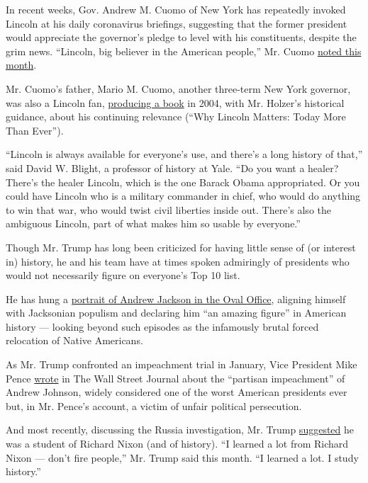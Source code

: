 In recent weeks, Gov. Andrew M. Cuomo of New York has repeatedly invoked
Lincoln at his daily coronavirus briefings, suggesting that the former
president would appreciate the governor's pledge to level with his
constituents, despite the grim news. ``Lincoln, big believer in the
American people,'' Mr. Cuomo
\href{https://www.governor.ny.gov/news/video-audio-photos-rush-transcript-amid-ongoing-covid-19-pandemic-governor-cuomo-announces-21}{noted
this month}.

Mr. Cuomo's father, Mario M. Cuomo, another three-term New York
governor, was also a Lincoln fan,
\href{https://www.nytimes.com/2004/07/18/books/chapters/why-lincoln-matters.html}{producing
a book} in 2004, with Mr. Holzer's historical guidance, about his
continuing relevance (``Why Lincoln Matters: Today More Than Ever'').

``Lincoln is always available for everyone's use, and there's a long
history of that,'' said David W. Blight, a professor of history at Yale.
``Do you want a healer? There's the healer Lincoln, which is the one
Barack Obama appropriated. Or you could have Lincoln who is a military
commander in chief, who would do anything to win that war, who would
twist civil liberties inside out. There's also the ambiguous Lincoln,
part of what makes him so usable by everyone.''

Though Mr. Trump has long been criticized for having little sense of (or
interest in) history, he and his team have at times spoken admiringly of
presidents who would not necessarily figure on everyone's Top 10 list.

He has hung a
\href{https://www.nytimes.com/2017/03/15/us/politics/trump-andrew-jackson-grave.html}{portrait
of Andrew Jackson in the Oval Office}, aligning himself with Jacksonian
populism and declaring him ``an amazing figure'' in American history ---
looking beyond such episodes as the infamously brutal forced relocation
of Native Americans.

As Mr. Trump confronted an impeachment trial in January, Vice President
Mike Pence
\href{https://www.wsj.com/articles/a-partisan-impeachment-a-profile-in-courage-11579220188}{wrote}
in The Wall Street Journal about the ``partisan impeachment'' of Andrew
Johnson, widely considered one of the worst American presidents ever
but, in Mr. Pence's account, a victim of unfair political persecution.

And most recently, discussing the Russia investigation, Mr. Trump
\href{https://www.nytimes.com/2020/05/08/us/politics/trump-barr-michael-flynn.html}{suggested}
he was a student of Richard Nixon (and of history). ``I learned a lot
from Richard Nixon --- don't fire people,'' Mr. Trump said this month.
``I learned a lot. I study history.''

